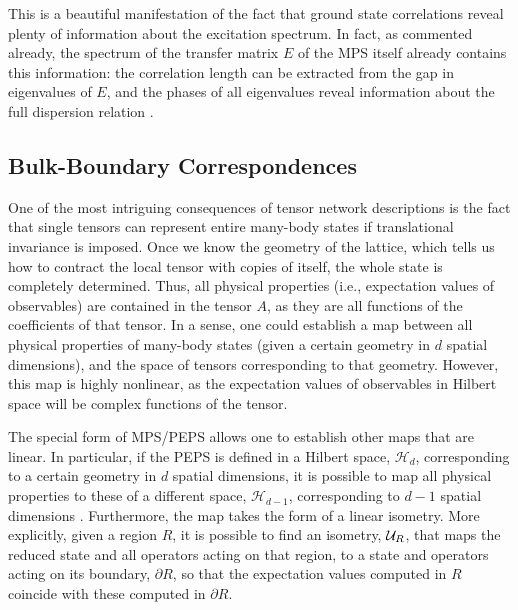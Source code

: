 \documentclass[rmp,aps,reprint,superscriptaddress,nobalancelastpage]{revtex4-1}
\begin{document}
This is a beautiful manifestation of the fact that ground state correlations reveal plenty of information about the excitation spectrum. In fact, as commented already, the spectrum of the transfer matrix $E$ of the MPS itself already contains this information: the correlation length can be extracted from the gap in eigenvalues of $E$, and the phases of all eigenvalues reveal information about the full dispersion relation \cite{zauner:tm-dispersion}.







\subsection{Bulk-Boundary Correspondences \label{bulk-boundary}}

One of the most intriguing consequences of tensor network descriptions is the fact that single tensors can represent entire many-body states if translational invariance is imposed. Once we know the geometry of the lattice, which tells us how to contract the local tensor with copies of itself, the whole state is completely determined. Thus, all physical properties (i.e., expectation values of observables) are contained in the tensor $A$, as they are all functions of the coefficients of that tensor. In a sense, one could establish a map between all physical properties of  many-body states (given a certain geometry in $d$ spatial dimensions), and the space of tensors corresponding to that geometry. However, this map is highly nonlinear, as the expectation values of observables in Hilbert space will be complex functions of the tensor.

The special form of MPS/PEPS allows one to establish other maps that are linear. In particular, if the PEPS is defined in a Hilbert space, $\mathcal H_d$, corresponding to a certain geometry in $d$ spatial dimensions, it is possible to map all physical properties to these of a different space, $\mathcal H_{d-1}$, corresponding to $d-1$ spatial dimensions \cite{cirac:peps-boundaries}. Furthermore, the map takes the form of a linear isometry. More explicitly, given a region $R$, it is possible to find an isometry, ${\cal U}_R$, that maps the reduced state and all operators acting on that region, to a state and operators acting on its boundary, $\partial R$, so that the expectation values computed in $R$ coincide with these computed in $\partial R$.
\end{document}
